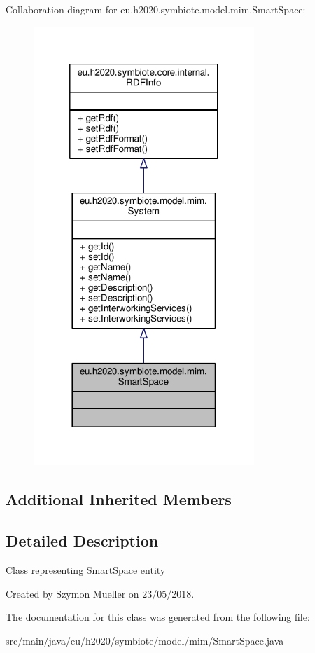 Collaboration diagram for eu.\+h2020.\+symbiote.\+model.\+mim.\+Smart\+Space\+:
\nopagebreak
\begin{figure}[H]
\begin{center}
\leavevmode
\includegraphics[width=236pt]{classeu_1_1h2020_1_1symbiote_1_1model_1_1mim_1_1SmartSpace__coll__graph}
\end{center}
\end{figure}
\subsection*{Additional Inherited Members}


\subsection{Detailed Description}
Class representing \hyperlink{classeu_1_1h2020_1_1symbiote_1_1model_1_1mim_1_1SmartSpace}{Smart\+Space} entity

Created by Szymon Mueller on 23/05/2018. 

The documentation for this class was generated from the following file\+:\begin{DoxyCompactItemize}
\item 
src/main/java/eu/h2020/symbiote/model/mim/Smart\+Space.\+java\end{DoxyCompactItemize}
